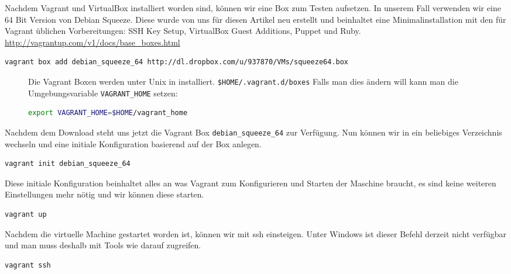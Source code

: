 \documentclass[12pt,a4paper,ngerman]{article}
\begin{document}
Nachdem Vagrant und VirtualBox installiert worden sind, können wir eine Box zum Testen aufsetzen. In unserem Fall verwenden wir eine 64 Bit Version von Debian Squeeze. Diese wurde von uns für diesen Artikel neu erstellt und beinhaltet eine Minimalinstallation mit den für Vagrant üblichen Vorbereitungen: SSH Key Setup, VirtualBox Guest Additions, Puppet und Ruby. \url{http://vagrantup.com/v1/docs/base_boxes.html}

\begin{lstlisting}[language=sh,caption=Download der Vagrant Box, label=vagrant-add]
vagrant box add debian_squeeze_64 http://dl.dropbox.com/u/937870/VMs/squeeze64.box
\end{lstlisting}

\begin{figure}
\vspace{-20pt}
\begin{boxedminipage}{4.5cm}
 Die Vagrant Boxen werden unter Unix in installiert. \lstinline!$HOME/.vagrant.d/boxes!
Falls man dies ändern will kann man die Umgebungsvariable \lstinline$VAGRANT_HOME$ setzen:
\begin{lstlisting}[language=sh,label=vagrant-home,frame=none,numbers=none]
export VAGRANT_HOME=$HOME/vagrant_home
\end{lstlisting}
\end{boxedminipage}
\vspace{-20pt}
\end{figure}
 

Nachdem dem Download steht uns jetzt die  Vagrant Box \lstinline$debian_squeeze_64$ zur Verfügung. Nun können wir in ein beliebiges Verzeichnis wechseln und eine initiale Konfiguration basierend auf der Box anlegen.

\begin{lstlisting}[language=sh,caption=Vagrant initialisieren, label=vagrant-init]
vagrant init debian_squeeze_64
\end{lstlisting}

Diese initiale Konfiguration beinhaltet alles an was Vagrant zum Konfigurieren und Starten der Maschine braucht, es sind keine weiteren Einstellungen mehr nötig und wir können diese starten.

\begin{lstlisting}[language=sh,caption=Starten der Vagrant Maschine, label=vagrant-up]
vagrant up
\end{lstlisting}

Nachdem die virtuelle Machine gestartet worden ist, können wir mit ssh einsteigen. Unter Windows ist dieser Befehl derzeit nicht verfügbar und man muss deshalb mit Tools wie \cite{putty} darauf zugreifen.
\begin{lstlisting}[language=sh,caption=Mit ssh in der Vagrant Maschine einsteigen, label=vagrant-ssh]
vagrant ssh
\end{lstlisting}
 
\end{document}

